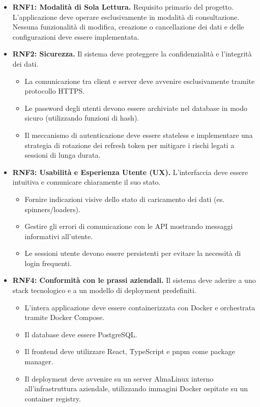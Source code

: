 \documentclass[12pt,a4paper,openright,twoside]{book}
\begin{document}
\begin{itemize}
    \item \textbf{RNF1: Modalità di Sola Lettura.} Requisito primario del progetto. L'applicazione deve operare esclusivamente in modalità di consultazione. Nessuna funzionalità di modifica, creazione o cancellazione dei dati e delle configurazioni deve essere implementata.

    \item \textbf{RNF2: Sicurezza.} Il sistema deve proteggere la confidenzialità e l'integrità dei dati.
          \begin{itemize}
              \item La comunicazione tra client e server deve avvenire esclusivamente tramite protocollo HTTPS.
              \item Le password degli utenti devono essere archiviate nel database in modo sicuro (utilizzando funzioni di hash).
              \item Il meccanismo di autenticazione deve essere stateless e implementare una strategia di rotazione dei refresh token per mitigare i rischi legati a sessioni di lunga durata.
          \end{itemize}

    \item \textbf{RNF3: Usabilità e Esperienza Utente (UX).} L'interfaccia deve essere intuitiva e comunicare chiaramente il suo stato.
          \begin{itemize}
              \item Fornire indicazioni visive dello stato di caricamento dei dati (es. spinners/loaders).
              \item Gestire gli errori di comunicazione con le API mostrando messaggi informativi all'utente.
              \item Le sessioni utente devono essere persistenti per evitare la necessità di login frequenti.
          \end{itemize}


    \item \textbf{RNF4: Conformità con le prassi aziendali.} Il sistema deve aderire a uno stack tecnologico e a un modello di deployment predefiniti.
          \begin{itemize}
              \item L'intera applicazione deve essere containerizzata con Docker e orchestrata tramite Docker Compose.
              \item Il database deve essere PostgreSQL.
              \item Il frontend deve utilizzare React, TypeScript e pnpm come package manager.
              \item Il deployment deve avvenire su un server AlmaLinux interno all'infrastruttura aziendale, utilizzando immagini Docker ospitate su un container registry.
          \end{itemize}

\end{itemize}
\end{document}
